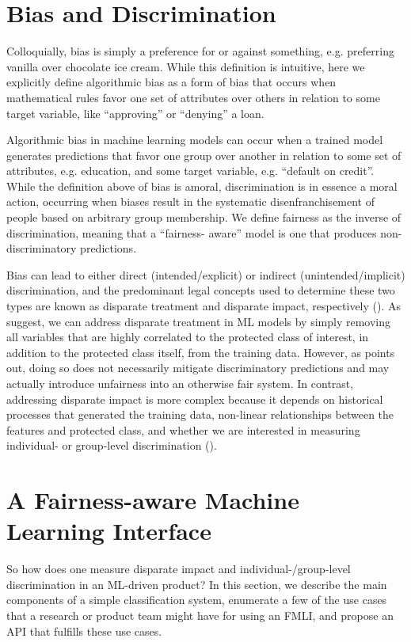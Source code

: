 \documentclass[man,natbib]{apa6}
\begin{document}
\section{Bias and Discrimination}
Colloquially, bias is simply a preference for or against something, e.g.
preferring vanilla over chocolate ice cream. While this definition is
intuitive, here we explicitly define algorithmic bias as a form of bias that
occurs when mathematical rules favor one set of attributes over others in
relation to some target variable, like ``approving'' or ``denying'' a loan.

Algorithmic bias in machine learning models can occur when a trained model
generates predictions that favor one group over another in relation to some set
of attributes, e.g. education, and some target variable, e.g. ``default on
credit''. While the definition above of bias is amoral, discrimination is in
essence a moral action, occurring when biases result in the systematic
disenfranchisement of people based on arbitrary group membership. We define
fairness as the inverse of discrimination, meaning that a ``fairness- aware''
model is one that produces non-discriminatory predictions.

Bias can lead to either direct (intended/explicit) or indirect
(unintended/implicit) discrimination, and the predominant legal concepts used to
determine these two types are known as disparate treatment and disparate impact,
respectively (\citealp{barocas2016big}). As \cite{kusner2017counterfactual,
kamiran2012data} suggest, we can address disparate treatment in ML models by
simply removing all variables that are highly correlated to the protected class
of interest, in addition to the protected class itself, from the training data.
However, as \cite{kusner2017counterfactual} points out, doing so does not
necessarily mitigate discriminatory predictions and may actually introduce
unfairness into an otherwise fair system. In contrast, addressing disparate
impact is more complex because it depends on historical processes that generated
the training data, non-linear relationships between the features and protected
class, and whether we are interested in measuring individual- or group-level
discrimination (\citealp{dwork2012fairness}).

\section{A Fairness-aware Machine Learning Interface}

So how does one measure
disparate impact and individual-/group-level discrimination in an ML-driven
product? In this section, we describe the main components of a simple
classification system, enumerate a few of the use cases that a research or
product team might have for using an FMLI, and propose an API that fulfills
these use cases.
\end{document}
